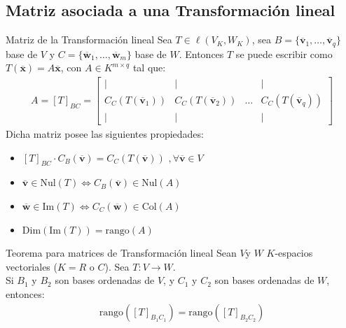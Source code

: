 \documentclass[a4paper, twoside]{article}
\numberwithin{equation}{section}
\numberwithin{figure}{section}
\numberwithin{table}{section}
\newcommand{\vect}[1]{\overline{\textbf{#1}}}
\newcommand{\col}[1]{\text{Col}(#1)}
\newcommand{\nul}[1]{\text{Nul}(#1)}
\newcommand{\im}[1]{\text{Im}(#1)}
\newcommand{\rg}[1]{\text{rango}\left(#1\right)}
\newcommand{\dime}[1]{\text{Dim}(#1)}
\begin{document}
\subsection{Matriz asociada a una Transformación lineal}
\begin{definicion*}{Matriz de la Transformación lineal}
	Sea $T \in \ell (V_K,W_K)$, sea $B=\{ \vect{v}_1,\ldots,\vect{v}_q \}$ base de $V$ y $C=\{ \vect{w}_1,\ldots,\vect{w}_m \}$ base de $W$. Entonces $T$ se puede escribir como $T(\vect{x})=A\vect{x}$, con $A \in K^{m \times q}$ tal que:
	\begin{align}
		A = [T]_{BC} =
		\begin{bmatrix}
			{|} & {|} & { } & {|} \\
			{C_C(T(\vect{v}_1))} & {C_C(T(\vect{v}_2))} & {\ldots} & {C_C(T(\vect{v}_q))} \\
			{|} & {|} & { } & {|}
		\end{bmatrix}
	\end{align}
	Dicha matriz posee las siguientes propiedades:
	\begin{itemize}
		\item $[T]_{BC} \cdot C_B(\vect{v})=C_C(T(\vect{v}))$ $,\forall \vect{v} \in V$
		\item $\vect{v} \in \nul{T} \Longleftrightarrow C_B(\vect{v}) \in \nul{A}$
		\item $\vect{w} \in \im{T} \Longleftrightarrow C_C(\vect{w}) \in \col{A}$
		\item $\dime{\im{T}}=\rg{A}$
	\end{itemize}
\end{definicion*}

\begin{teorema*}{Teorema para matrices de Transformación lineal}
	Sean $V$y $W$ $K$-espacios vectoriales ($K=R$ o $C$). Sea $T:V \to W$.\\
	
	Si $B_1$ y $B_2$ son bases ordenadas de $V$, y $C_1$ y $C_2$ son bases ordenadas de $W$, entonces:
	\begin{align}
		\rg{[T]_{B_1 C_1}}=\rg{[T]_{B_2 C_2}}
	\end{align}
\end{teorema*}
\end{document}
